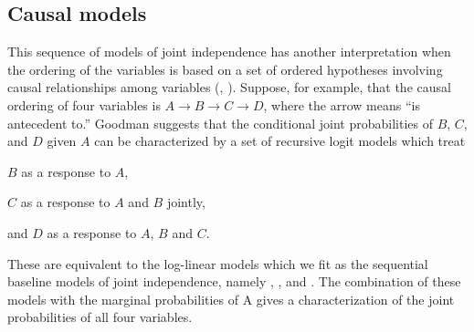 \subsection{Causal models}\label{sec:causal}

This sequence of models of joint independence has another
interpretation when the ordering of the variables is based on a set
of ordered hypotheses involving causal relationships among
variables 
(\citet{Goodman:73}, \citet[\S 7.2]{Fienberg:80}).  Suppose, for example,
that the causal ordering of four variables is \(A \rightarrow B
\rightarrow C \rightarrow D\), where the arrow means ``is antecedent
to.''  Goodman suggests that the conditional joint probabilities of
$B$, $C$, and $D$ given $A$ can be characterized by a set of
recursive logit models which treat
\begin{seriate}
\item $B$ as a response to $A$,
\item $C$
as a response to $A$ and $B$ jointly,
\item and $D$ as a response to $A$,
$B$ and $C$.
\end{seriate}
These are equivalent to the log-linear models which
we fit as the sequential baseline models of joint independence,
namely , , and .  The combination of these
models with the marginal probabilities of A gives a characterization
of the joint probabilities of all four variables.

